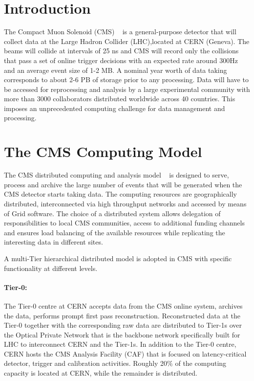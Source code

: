 \section{Introduction}
\label{intro}
The Compact Muon Solenoid (CMS) ~\cite{RefCMS} is a general-purpose detector
that will collect data at the Large Hadron Collider (LHC),located at CERN
(Geneva).
The beams will collide at intervals of 25 ns and CMS will record only the collisions
that pass a set of %
online trigger decisions with an expected rate around 300Hz and an
average event size of 1-2 MB. A nominal year worth of data taking 
corresponds to about 2-6 PB of storage prior to any processing.
Data will have to be accessed for reprocessing and analysis by a
large experimental community with more than 3000 collaborators distributed
worldwide across 40 countries. This imposes an unprecedented computing
challenge for data management and processing.

\section{The CMS Computing Model}
\label{sec:2}
The CMS distributed computing and analysis model ~\cite{RefCM} is designed to serve, process and archive the %
large number of events that will be generated when the CMS detector starts taking data. The computing resources are geographically distributed, interconnected via high throughput networks and accessed by means of Grid software. 
The choice of a distributed system allows delegation of responsibilities to local CMS communities, access to additional funding channels and ensures load balancing of the available resources while replicating the interesting data in different sites.


A multi-Tier hierarchical distributed model is adopted in CMS with specific functionality at different levels.
\paragraph{Tier-0:}
The Tier-0 centre at CERN accepts data from the CMS online system, archives the data, performs prompt first pass reconstruction. Reconstructed data at the Tier-0 together with the corresponding raw data are distributed to Tier-1s over the Optical Private Network that is the backbone network specifically built for LHC to interconnect CERN and the Tier-1s.
In addition to the Tier-0 centre, CERN hosts the CMS Analysis Facility (CAF) that is focused on latency-critical detector, trigger and calibration activities.
Roughly 20\% of the computing capacity is located at CERN, while the remainder is distributed.

